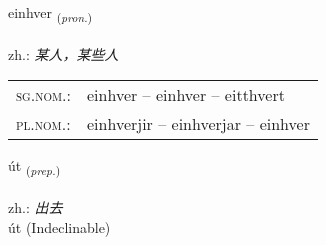 \documentclass[frontgrid, backgrid]{flacards}\usepackage[]{graphicx}\usepackage[]{xcolor}
\begin{document}
\renewcommand{\blhead}{\vskip5pt {\small\bfseries\footnotesize Fornafn | 代词 }}
\renewcommand{\bcfoot}{\vskip5pt \hspace{2pt}{\small\bfseries\footnotesize 1K}}


{einhver \small{\textsubscript{(\textit{pron.})}} \\[1ex] %
 \\
zh.: \emph{某人，某些人} \\  [2ex]
\renewcommand*{\arraystretch}{0.8}
\begin{tabular}{ll}
\textsc{sg.nom.}: & einhver  --  einhver -- eitthvert \\ 
\textsc{pl.nom.}: & einhverjir -- einhverjar -- einhver
\end{tabular}
}


\renewcommand{\flhead}{\vskip5pt \fboxsep=0pt {\small\bfseries\footnotesize Forsetning | 介词}}
\renewcommand{\fcfoot}{\vskip5pt \fboxsep=0pt \hspace{2pt}{\small\bfseries\footnotesize 1K}}

\renewcommand{\blhead}{\vskip5pt {\small\bfseries\footnotesize Forsetning | 介词 }}
\renewcommand{\bcfoot}{\vskip5pt \hspace{2pt}{\small\bfseries\footnotesize 1K}}


{út \small{\textsubscript{(\textit{prep.})}} \\[1ex]
\textphonetic{[uːt]} \\
zh.: \emph{出去} \\  [2ex]
út (Indeclinable)}

\renewcommand{\flhead}{\vskip5pt \fboxsep=0pt {\small\bfseries\footnotesize Sagnorð | 动词}}
\renewcommand{\fcfoot}{\vskip5pt \fboxsep=0pt \hspace{2pt}{\small\bfseries\footnotesize 1K}}

\renewcommand{\blhead}{\vskip5pt {\small\bfseries\footnotesize Sagnorð | 动词 }}
\renewcommand{\bcfoot}{\vskip5pt \hspace{2pt}{\small\bfseries\footnotesize 1K}}
\end{document}

